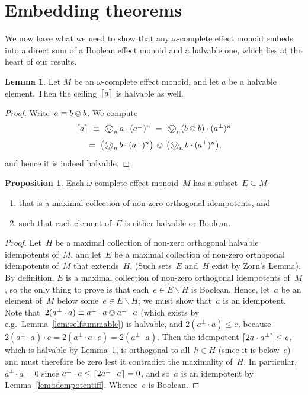 \documentclass[10pt,conference]{IEEEtran}
\DeclarePairedDelimiter{\ceil}{\lceil}{\rceil}
\newcounter{counter}
\theoremstyle{definition}
\newtheorem{proposition}[counter]{Proposition}
\newtheorem{lemma}[counter]{Lemma}
\newcommand{\bigovee}{\mathop{\vphantom{\sum}\mathchoice%
        {\vcenter{\hbox{\huge $\ovee$}}}%
        {\vcenter{\hbox{\Large $\ovee$}}}%
        {\ovee}{\ovee}}\displaylimits}
\begin{document}
\section{Embedding theorems}\label{sec:embeddingtheorem}

We now have what we need to show that any $\omega$-complete effect monoid embeds into a direct sum of a Boolean effect monoid and a halvable one, which lies at the heart of our results.

\begin{lemma}
\label{lem:ceilhalveable}
    Let $M$ be an $\omega$-complete effect monoid, and let $a$ be a halvable element.
    Then the ceiling~$\ceil{a}$
    is halvable as well.
\end{lemma}
\begin{proof}
Write~$a\equiv b\ovee b$.
We compute
\begin{multline*}
\textstyle
    \ceil{a} \ \equiv\ 
    \bigovee_n a  \cdot  (a^\perp)^n \ =\  
    \bigovee_n (b\ovee b) \cdot (a^\perp)^n \\
    \ =\  
\textstyle
    \bigl(\bigovee_n b \cdot (a^\perp)^n\bigr) \,\ovee\, \bigl(
    \bigovee_n b \cdot (a^\perp)^n \bigr),
\end{multline*}
    and hence it is indeed halvable.
\end{proof}

\begin{proposition}\label{prop:maxcollectionbooleanhalveable}
Each $\omega$-complete effect monoid~$M$
has a subset~$E \subseteq M$ 
\begin{enumerate}
\item
that is a maximal collection of non-zero orthogonal idempotents,
and
\item
such that each element of~$E$ is either halvable or Boolean.
\end{enumerate}
\end{proposition}
\begin{proof}
Let~$H$ be a maximal collection
of non-zero orthogonal halvable idempotents of~$M$,
and let~$E$ be a maximal collection
of non-zero orthogonal idempotents of~$M$
that extends~$H$.
(Such sets~$E$ and~$H$ exist by Zorn's Lemma).
By definition, $E$ is a maximal collection
of non-zero orthogonal idempotents of~$M$,
so the only thing to prove
is that each~$e\in E\backslash H$ is Boolean.
Hence, let~$a$ be an element of~$M$ below
some~$e\in E\backslash H$;
we must show that~$a$ is an idempotent.
    Note that~$2(a^\perp \cdot a)\equiv a^\perp \cdot a \ovee a^\perp\cdot a$ 
    (which exists by e.g.~Lemma~\ref{lem:selfsummable}) is halvable,
    and $2(a^\perp\cdot a) \leq e$,
    because $2(a^\perp \cdot a)\cdot e = 2(a^\perp \cdot a \cdot e)
     = 2(a^\perp\cdot a)$.
Then the idempotent $\ceil{2a\cdot a^\perp} \leq e$,
    which is halvable by Lemma~\ref{lem:ceilhalveable},
is orthogonal to all~$h\in H$
    (since it is below~$e$)
and must therefore be zero
lest it contradict the maximality of~$H$.
In particular, 
    $a^\perp\cdot a=0$ since $a^\perp \cdot a \leq \ceil{2a^\perp\cdot a}=0$,
    and so~$a$ is an idempotent by Lemma~\ref{lem:idempotentiff}.
Whence~$e$ is Boolean.
\end{proof}
\end{document}
